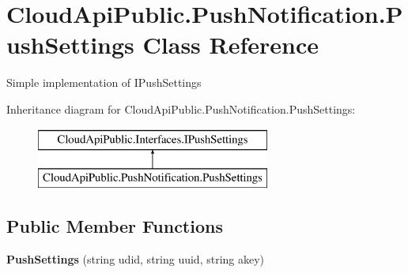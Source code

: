 \hypertarget{class_cloud_api_public_1_1_push_notification_1_1_push_settings}{\section{Cloud\-Api\-Public.\-Push\-Notification.\-Push\-Settings Class Reference}
\label{class_cloud_api_public_1_1_push_notification_1_1_push_settings}
}


Simple implementation of I\-Push\-Settings  


Inheritance diagram for Cloud\-Api\-Public.\-Push\-Notification.\-Push\-Settings\-:\begin{figure}[H]
\begin{center}
\leavevmode
\includegraphics[height=2.000000cm]{class_cloud_api_public_1_1_push_notification_1_1_push_settings}
\end{center}
\end{figure}
\subsection*{Public Member Functions}
\begin{DoxyCompactItemize}
\item 
\hypertarget{class_cloud_api_public_1_1_push_notification_1_1_push_settings_a2b91cde956ee4d607b7bd58efb70497b}{{\bfseries Push\-Settings} (string udid, string uuid, string akey)}\label{class_cloud_api_public_1_1_push_notification_1_1_push_settings_a2b91cde956ee4d607b7bd58efb70497b}

\end{DoxyCompactItemize}
